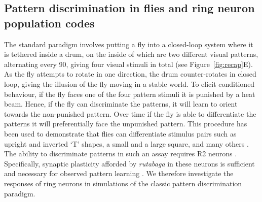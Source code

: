 \subsection*{Pattern discrimination in flies and ring neuron population codes}
The standard paradigm involves putting a fly into a closed-loop system where it is tethered inside a drum, on the inside of which are two different visual patterns, alternating every 90\degree, giving four visual stimuli in total \cite{Dill1993,Ernst1999,Liu2006,Pan2009} (see Figure~\ref{fig:recap}E). As the fly attempts to rotate in one direction, the drum counter-rotates in closed loop, giving the illusion of the fly moving in a stable world. To elicit conditioned behaviour, if the fly faces one of the four pattern stimuli it is punished by a heat beam. Hence, if the fly can discriminate the patterns, it will learn to orient towards the non-punished pattern. Over time if the fly is able to differentiate the patterns it will preferentially face the unpunished pattern. This procedure has been used to demonstrate that flies can differentiate stimulus pairs such as upright and inverted `T' shapes, a small and a large square, and many others \cite{Ernst1999}. The ability to discriminate patterns in such an assay requires R2 neurons \cite{Ernst1999,Liu2006,Wang2008}. Specifically, synaptic plasticity afforded by \emph{rutabaga} in these neurons is sufficient and necessary for observed pattern learning \cite{Pan2009}. We therefore investigate the responses of ring neurons in simulations of the classic pattern discrimination paradigm.

